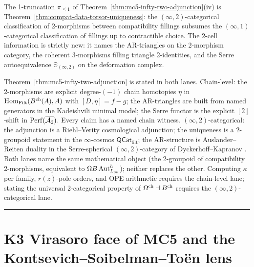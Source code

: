 \begin{remark}
\label{rem:infty-two-one-truncation}
%
The 1-truncation $\pi_{\le 1}$ of
Theorem~\textup{\ref{thm:mc5-infty-two-adjunction}}(iv) is
Theorem~\textup{\ref{thm:compat-data-torsor-uniqueness}}: the
$(\infty,2)$-categorical classification of 2-morphisms between
compatibility fillings subsumes the $(\infty,1)$-categorical
classification of fillings up to contractible choice. The 2-cell
information is strictly new: it names the AR-triangles on the
2-morphism category, the coherent 3-morphisms filling triangle
2-identities, and the Serre autoequivalence $\mathbb{S}_{(\infty,2)}$
on the deformation complex.
\end{remark}

\begin{remark}
\label{rem:infty-two-lane-parity}
%
Theorem~\textup{\ref{thm:mc5-infty-two-adjunction}} is stated in
both lanes. Chain-level: the 2-morphisms are explicit degree-$(-1)$
chain homotopies $\eta$ in $\mathrm{Hom}_{\mathrm{Filt}}(B^{\mathrm{ch}}(A),A)$
with $[D,\eta]=f-g$; the AR-triangles are built from named generators
in the Kadeishvili minimal model; the Serre functor is the explicit
$[2]$-shift in $\mathrm{Perf}(\overline{\mathcal{A}_2})$. Every claim has a named chain
witness. $(\infty,2)$-categorical: the adjunction is a
Riehl--Verity cosmological adjunction; the uniqueness is a
2-groupoid statement in the $\infty$-cosmos
$\mathsf{QCat}_{\mathrm{filt}}$; the AR-structure is Auslander--Reiten
duality in the Serre-spherical $(\infty,2)$-category of Dyckerhoff--Kapranov
\cite[]{DyckerhoffKapranov2019}. Both lanes name the
same mathematical object (the 2-groupoid of compatibility 2-morphisms,
equivalent to $\Omega B\operatorname{Aut}^h_{L_\infty}$); neither replaces the other.
Computing $\kappa$ per family, $r(z)$-pole orders, and OPE arithmetic
requires the chain-level lane; stating the universal 2-categorical
property of $\Omega^{\mathrm{ch}}\dashv B^{\mathrm{ch}}$ requires the $(\infty,2)$-categorical lane.
\end{remark}

\begin{center}
\rule{0.3\textwidth}{0.4pt}
\end{center}

\section{K3 Virasoro face of MC5 and the Kontsevich--Soibelman--To\"en lens}
\label{sec:mc5clmp-supplement}

